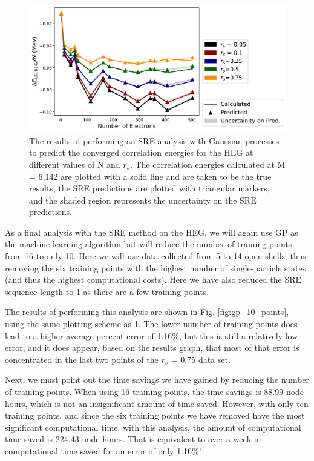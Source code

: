 \begin{figure}
    \centering
    \includegraphics[scale=0.75]{Images/Chapter7/ElectronGas/BRR_EG_MSU_uncertainities-GP.png}
    \caption{The results of performing an SRE analysis with Gaussian processes to predict the converged correlation energies for the HEG at different values of N and $r_s$.  The correlation energies calculated at M = 6,142 are plotted with a solid line and are taken to be the true results, the SRE predictions are plotted with triangular markers, and the shaded region represents the uncertainty on the SRE predictions.}
    \label{fig:gp_16_points}
\end{figure}


As a final analysis with the SRE method on the HEG, we will again use GP as the machine learning algorithm but will reduce the number of training points from 16 to only 10. Here we will use data collected from 5 to 14 open shells, thus removing the six training points with the highest number of single-particle states (and thus the highest computational costs). Here we have also reduced the SRE sequence length to 1 as there are a few training points.

The results of performing this analysis are shown in Fig. \ref{fig:gp_10_points}, using the same plotting scheme as \ref{fig:gp_16_points}. The lower number of training points does lead to a higher average percent error of 1.16$\%$, but this is still a relatively low error, and it does appear, based on the results graph, that most of that error is concentrated in the last two points of the $r_s$ = 0.75 data set.

Next, we must point out the time savings we have gained by reducing the number of training points. When using 16 training points, the time savings is 88.99 node hours, which is not an insignificant amount of time saved. However, with only ten training points, and since the six training points we have removed have the most significant computational time, with this analysis, the amount of computational time saved is 224.43 node hours. That is equivalent to over a week in computational time saved for an error of only 1.16$\%$!

